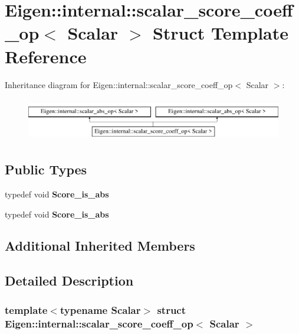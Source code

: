\hypertarget{struct_eigen_1_1internal_1_1scalar__score__coeff__op}{}\section{Eigen\+:\+:internal\+:\+:scalar\+\_\+score\+\_\+coeff\+\_\+op$<$ Scalar $>$ Struct Template Reference}
\label{struct_eigen_1_1internal_1_1scalar__score__coeff__op}
Inheritance diagram for Eigen\+:\+:internal\+:\+:scalar\+\_\+score\+\_\+coeff\+\_\+op$<$ Scalar $>$\+:\begin{figure}[H]
\begin{center}
\leavevmode
\includegraphics[height=1.879195cm]{struct_eigen_1_1internal_1_1scalar__score__coeff__op}
\end{center}
\end{figure}
\subsection*{Public Types}
\begin{DoxyCompactItemize}
\item 
\mbox{\label{struct_eigen_1_1internal_1_1scalar__score__coeff__op_a99a09ca4f3cc9013543c01154aff8d8c}} 
typedef void {\bfseries Score\+\_\+is\+\_\+abs}
\item 
\mbox{\label{struct_eigen_1_1internal_1_1scalar__score__coeff__op_a99a09ca4f3cc9013543c01154aff8d8c}} 
typedef void {\bfseries Score\+\_\+is\+\_\+abs}
\end{DoxyCompactItemize}
\subsection*{Additional Inherited Members}


\subsection{Detailed Description}
\subsubsection*{template$<$typename Scalar$>$\newline
struct Eigen\+::internal\+::scalar\+\_\+score\+\_\+coeff\+\_\+op$<$ Scalar $>$}



